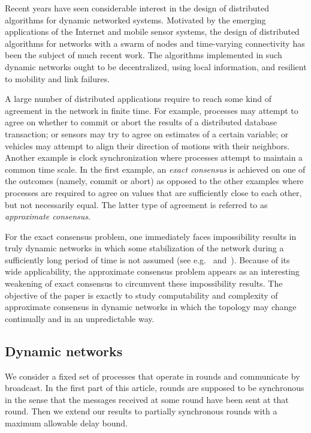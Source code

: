 \documentclass[a4paper]{article}
\theoremstyle{newthm}
\begin{document}
Recent years have seen considerable interest in the design of distributed algorithms
	for dynamic networked systems.
Motivated by the emerging applications of the Internet and mobile sensor systems,
	the design of distributed algorithms for networks with a swarm of nodes and  time-varying
	connectivity has been the subject of much recent work.
The algorithms implemented in such dynamic networks ought to be  decentralized, using local information,
	and resilient to mobility and link failures.

A large number of distributed applications  require to reach some kind of agreement in the network
	in finite time.
For example,  processes may attempt to agree on whether to commit or abort the results of
	a distributed database transaction; or sensors may try to agree on estimates of
	a certain variable; or vehicles may attempt to align their direction of motions with their 
	neighbors.
Another example is clock synchronization where processes attempt to maintain a common time scale.
In the first example, an {\em  exact consensus} is achieved on one of the outcomes (namely,  commit or
	abort) as opposed to the other examples where processes are required to agree on values
	that are sufficiently close to each other, but not necessarily equal.
The latter type of agreement is referred to as {\em approximate consensus}.
	
For the exact consensus problem, one immediately faces  impossibility results in truly dynamic networks
	in which some stabilization of the network during a sufficiently long period of time  is not assumed
	(see e.g.~\cite{SW89} and~\cite[Chapter 5]{Lyn96}).
Because of its wide applicability, the approximate consensus problem appears as an interesting weakening of
	exact consensus to circumvent these impossibility results.
The objective of the paper is exactly to study computability and complexity of approximate consensus 
	in dynamic networks in which the topology may change continually and in an unpredictable way.


\subsection{Dynamic networks}

We consider a fixed set of processes that operate in rounds and communicate 
	by broadcast.
In the first part of this article, rounds are supposed to be synchronous in the sense that
	the messages  received at some round  have been sent at that round.
Then we extend our results to partially synchronous rounds with a maximum allowable
	delay bound.
\end{document}
